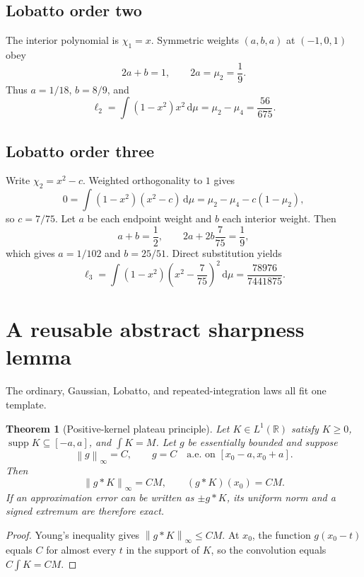 \documentclass[11pt]{article}
\numberwithin{equation}{section}
\newtheorem{theorem}{Theorem}[section]
\theoremstyle{definition}
\theoremstyle{remark}
\DeclareMathOperator{\supp}{supp}
\newcommand{\R}{\mathbb R}
\newcommand{\dd}{\,\mathrm d}
\newcommand{\norm}[1]{\left\lVert#1\right\rVert}
\begin{document}
\subsection{Lobatto order two}

The interior polynomial is $\chi_1=x$.  Symmetric weights $(a,b,a)$ at $(-1,0,1)$ obey
\[
 2a+b=1,
 \qquad
 2a=\mu_2=\frac19.
\]
Thus $a=1/18$, $b=8/9$, and
\[
 \ell_2=\int(1-x^2)x^2\dd\mu
 =\mu_2-\mu_4
 =\frac{56}{675}.
\]

\subsection{Lobatto order three}

Write $\chi_2=x^2-c$.  Weighted orthogonality to $1$ gives
\[
 0=\int(1-x^2)(x^2-c)\dd\mu
 =\mu_2-\mu_4-c(1-\mu_2),
\]
so $c=7/75$.  Let $a$ be each endpoint weight and $b$ each interior weight.  Then
\[
 a+b=\frac12,
 \qquad
 2a+2b\frac7{75}=\frac19,
\]
which gives $a=1/102$ and $b=25/51$.  Direct substitution yields
\[
 \ell_3=\int(1-x^2)\left(x^2-\frac7{75}\right)^2\dd\mu
 =\frac{78976}{7441875}.
\]

\section{A reusable abstract sharpness lemma}
\label{app:abstract-lemma}

The ordinary, Gaussian, Lobatto, and repeated-integration laws all fit one template.

\begin{theorem}[Positive-kernel plateau principle]
\label{thm:abstract-plateau}
Let $K\in L^1(\R)$ satisfy $K\ge0$, $\supp K\subseteq[-a,a]$, and $\int K=M$.  Let $g$ be essentially bounded and suppose
\[
 \norm g_\infty=C,
 \qquad
 g=C\quad\text{a.e. on }[x_0-a,x_0+a].
\]
Then
\begin{equation}
 \norm{g*K}_\infty=CM,
 \qquad
 (g*K)(x_0)=CM.
 \label{eq:abstract-plateau}
\end{equation}
If an approximation error can be written as $\pm g*K$, its uniform norm and a signed extremum are therefore exact.
\end{theorem}

\begin{proof}
Young's inequality gives $\norm{g*K}_\infty\le CM$.  At $x_0$, the function $g(x_0-t)$ equals $C$ for almost every $t$ in the support of $K$, so the convolution equals $C\int K=CM$.
\end{proof}
\end{document}

